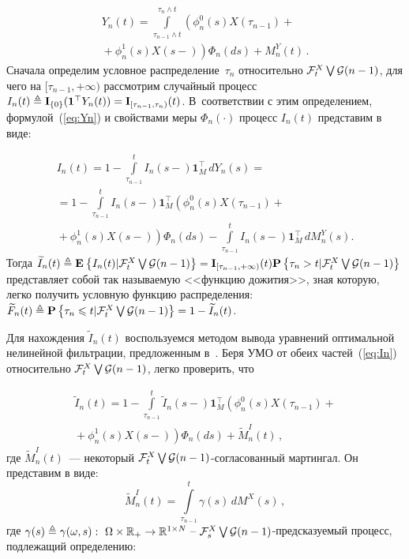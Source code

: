 \begin{multicols}{2}
{ \vspace*{-2pt}

\noindent
 \begin{multline}
 Y_n(t) = \int\limits_{\tau_{n-1}\wedge t}^{\tau_{n} \wedge t} \left(
 \phi^0_{n}(s)X(\tau_{n-1})+{}\right.\\
\left. {}+\phi^1_{n}(s)X(s-)
 \right)\Phi_{n}(ds) + M^Y_n(t)\,.
 \label{eq:Yn}
 \end{multline}
 Сначала определим условное распределение~$\tau_{n}$ относительно
 ${\mathcal F}_t^X \bigvee {\mathcal G}(n-1)$, для чего на $[\tau_{n-1},+\infty)$
 рассмотрим случайный процесс $I_n(t) \ebd \mathbf{I}_{\{0\}}
 (\mathbf{1}^{\top}Y_n(t))\hm=\mathbf{I}_{[\tau_{n-1},\tau_{n})}(t)$.
 В~соответствии с этим определением, формулой~(\ref{eq:Yn}) и свойствами
 меры $\Phi_n(\cdot)$ процесс $I_n(t)$ представим в виде:

 \noindent
 \begin{multline}
 I_n(t) = 1 - \int\limits_{\tau_{n-1}}^{t}I_n(s-)\mathbf{1}_M^{\top}\,dY_n(s) = {}\\
{} = 1 - \int\limits_{\tau_{n-1}}^{t}I_n(s-)\mathbf{1}_M^{\top}\left(
\phi^0_{n}(s)X(\tau_{n-1})+{}\right.\\
\!\!\!\left.{}+\phi^1_{n}(s)X(s-)
 \right) \Phi_{n}(ds) -
 \int\limits_{\tau_{n-1}}^{t}I_n(s-)\mathbf{1}_M^{\top} \,dM^Y_n(s).
\!\! \label{eq:In}
 \end{multline}
 Тогда $\widetilde{I}_n(t) \ebd \me{}{I_n(t)|\ff_t^X \bigvee \G(n-1)} \hm=
 \mathbf{I}_{[\tau_{n-1},+\infty)}(t)\pp{\tau_{n}>t|\ff_t^X \bigvee \G(n-1)}$
 представляет собой так называемую <<функцию дожития>>, зная которую, легко получить
 условную функцию распределения: $\widetilde{F}_n(t) \ebd \pp{\tau_{n}\hm\leqslant t|\ff_t^X \bigvee \G(n\hm-1)} \hm=
 1\hm- \widetilde{I}_n(t)$.

 Для нахождения $\widetilde{I}_n(t)$ воспользуемся методом вывода уравнений
 оптимальной нелинейной фильтрации, предложенным в~\cite{WongH_85}. Беря УМО
 от обеих частей~(\ref{eq:In}) относительно ${\mathcal F}_t^X \bigvee {\mathcal G}(n-1)$, легко
 проверить, что

 \columnbreak

 \noindent
 \begin{multline}
 \widetilde{I}_n(t) = 1 - \int\limits_{\tau_{n-1}}^{t}\widetilde{I}_n(s-)
 \mathbf{1}_M^{\top}\left(\phi^0_{n}(s)X(\tau_{n-1})+{}\right.\\
\left. {}+\phi^1_{n}(s)X(s-)
 \right) \Phi_{n}(ds) + \widetilde{M}^I_n(t)\,,
 \label{eq:wtIn}
 \end{multline}
 где $\widetilde{M}^I_n(t)$~--- некоторый ${\mathcal F}_t^X \bigvee {\mathcal G}(n-1)$-со\-гла\-со\-ван\-ный
 мартингал. Он представим в виде:
 $$
 \widetilde{M}^I_n(t)= \int\limits_{\tau_{n-1}}^{t}\gamma(s)\,dM^X(s)\,,
 $$
 где $\gamma(s) \triangleq \gamma(\omega,s): \ \Omega \times \mathbb{R}_+
 \to \mathbb{R}^{1 \times N}\ \mbox{--}\ {\mathcal F}_s^X \bigvee {\mathcal G}(n-1)$-пред\-ска\-зу\-емый процесс, подлежащий определению:



}
\end{multicols}
